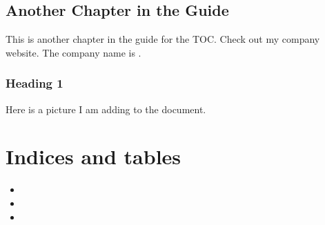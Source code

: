 \documentclass[letterpaper,10pt,english]{sphinxmanual}
\begin{document}
\section{Another Chapter in the Guide}
\label{\detokenize{Chapter2:another-chapter-in-the-guide}}
This is another chapter in the guide for the TOC.
Check out my company website. The company name is .


\subsection{Heading 1}
\label{\detokenize{Chapter2:heading-1}}
Here is a picture I am adding to the document.

\noindent{}



\chapter{Indices and tables}
\label{\detokenize{index:indices-and-tables}}\begin{itemize}
\item {} 

\item {} 

\item {} 

\end{itemize}



\renewcommand{\indexname}{Index}
\printindex
\end{document}
